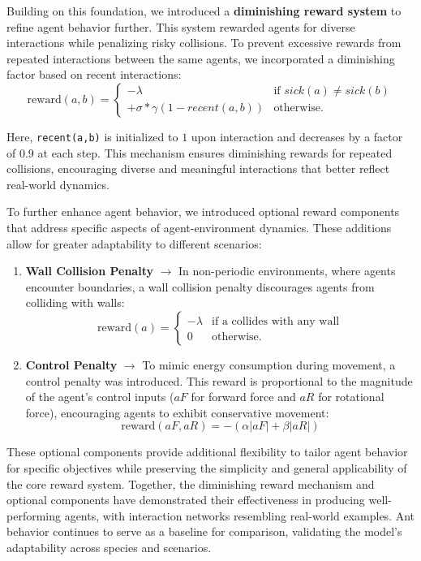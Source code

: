 \documentclass[9pt]{IEEEtran}
\begin{document}
Building on this foundation, we introduced a \textbf{diminishing reward system} to refine agent behavior further. This system rewarded agents for diverse interactions while penalizing risky collisions. To prevent excessive rewards from repeated interactions between the same agents, we incorporated a diminishing factor based on recent interactions:
$$
\mathrm{reward}(a, b) = \begin{cases}
    -\lambda & \text{if } sick(a) \neq sick(b) \\ 
    +\sigma * \gamma (1 - recent(a,b)) & \text{otherwise.}
\end{cases}
$$

Here, \texttt{recent(a,b)} is initialized to $1$ upon interaction and decreases by a factor of $0.9$ at each step. This mechanism ensures diminishing rewards for repeated collisions, encouraging diverse and meaningful interactions that better reflect real-world dynamics.

To further enhance agent behavior, we introduced optional reward components that address specific aspects of agent-environment dynamics. These additions allow for greater adaptability to different scenarios:

\begin{enumerate}
    \item \textbf{Wall Collision Penalty} $\rightarrow$ In non-periodic environments, where agents encounter boundaries, a wall collision penalty discourages agents from colliding with walls:
    $$
    \mathrm{reward}(a) = \begin{cases}
        -\lambda & \text{if a collides with any wall}\\ 
        0 & \text{otherwise.}
    \end{cases}
    $$
    \item \textbf{Control Penalty} $\rightarrow$ To mimic energy consumption during movement, a control penalty was introduced. This reward is proportional to the magnitude of the agent’s control inputs ($aF$ for forward force and $aR$ for rotational force), encouraging agents to exhibit conservative movement:
    $$
    \text{reward}(aF, aR) = -(\alpha |aF| + \beta |aR|)
    $$
\end{enumerate}

These optional components provide additional flexibility to tailor agent behavior for specific objectives while preserving the simplicity and general applicability of the core reward system. Together, the diminishing reward mechanism and optional components have demonstrated their effectiveness in producing well-performing agents, with interaction networks resembling real-world examples. Ant behavior continues to serve as a baseline for comparison, validating the model's adaptability across species and scenarios.
\end{document}
